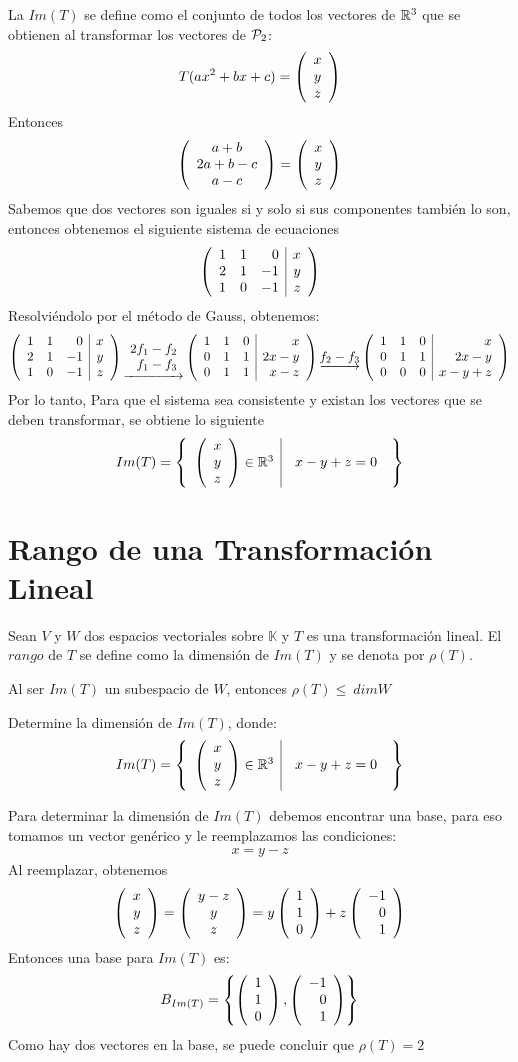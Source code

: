 \begin{sol}
La $Im(T)$ se define como el conjunto de todos los vectores de $\rtres$ que se obtienen al transformar los vectores de $\pdos$:
$$T(ax^2 + bx + c) = \vectrtrescent{x}{y}{z}$$
Entonces
$$\vectrtrescent{a+b}{2a+b-c}{a-c} = \vectrtrescent{x}{y}{z}$$
Sabemos que dos vectores son iguales si y solo si sus componentes también lo son, entonces obtenemos el siguiente sistema de ecuaciones
$$\reducir{rrr|r}{
1&1&0&x\\
2&1&-1&y\\
1&0&-1&z
}$$
Resolviéndolo por el método de Gauss, obtenemos:
$$\reducir{rrr|r}{
1&1&0&x\\
2&1&-1&y\\
1&0&-1&z
}
\underrightarrow{\begin{array}{r}
    2f_1 - f_2\\
    f_1 - f_3
\end{array}}
\reducir{rrr|r}{
1&1&0&x\\
0&1&1&2x-y\\
0&1&1&x-z
}
\underrightarrow{f_2 - f_3}
\reducir{rrr|r}{
1&1&0&x\\
0&1&1&2x-y\\
0&0&0&x-y+z
}$$
Por lo tanto, Para que el sistema sea consistente y existan los vectores que se deben transformar, se obtiene lo siguiente
$$\svrtres{Im(T)}{x}{y}{z}{\begin{array}{r}
    x-y+z = 0
    \end{array}}$$
\end{sol}
\section{Rango de una Transformación Lineal}
\begin{dfn}
Sean $V$ y $W$ dos espacios vectoriales sobre $\mathbb{K}$ y $T$ es una transformación lineal. El $rango$ de $T$ se define como la dimensión de $Im(T)$ y se denota por $\rho(T)$.
\end{dfn}
\begin{theorem}[Corolario]
Al ser $Im(T)$ un subespacio de $W$, entonces $\rho(T) \leq~dimW$
\end{theorem} 
\begin{ejemplo}
Determine la dimensión de $Im(T)$, donde:
$$\svrtres{Im(T)}{x}{y}{z}{\begin{array}{r}
    x-y+z = 0
    \end{array}}$$
\end{ejemplo}
\begin{sol}
Para determinar la dimensión de $Im(T)$ debemos encontrar una base, para eso tomamos un vector genérico y le reemplazamos las condiciones:
\begin{align*}
    x = y-z
\end{align*}
Al reemplazar, obtenemos
$$\vectrtrescent{x}{y}{z} = \vectrtrescent{y-z}{y}{z} = y\vectrtrescent{1}{1}{0} + z\vectrtres{-1}{0}{1}$$
Entonces una base para $Im(T)$ es:
$$B_{Im(T)} = \llav{\vectrtrescent{1}{1}{0},\vectrtres{-1}{0}{1}}$$
Como hay dos vectores en la base, se puede concluir que $\rho(T) = 2$
\end{sol}


